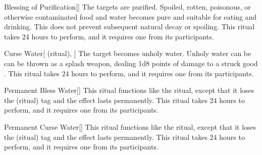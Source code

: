 \lowercase{\hypertarget{spell:Blessing of Purification}{}}\label{spell:Blessing of Purification}
\begin{freeability}[Rank 1]{\hypertarget{spell:Blessing of Purification}{Blessing of Purification}}[]
The targets are purified.
Spoiled, rotten, poisonous, or otherwise contaminated food and water becomes pure and suitable for eating and drinking.
This does not prevent subsequent natural decay or spoiling.
This ritual takes 24 hours to perform, and it requires one  from its participants.
\end{freeability}
\vspace{0.25em}



\lowercase{\hypertarget{spell:Curse Water}{}}\label{spell:Curse Water}
\begin{attuneability}[Rank 1]{\hypertarget{spell:Curse Water}{Curse Water}}[ (ritual), ]
The target becomes unholy water.
Unholy water can be can be thrown as a splash weapon, dealing 1d8 points of damage to a struck good .
This ritual takes 24 hours to perform, and it requires one  from its participants.
\end{attuneability}
\vspace{0.25em}



\lowercase{\hypertarget{spell:Permanent Bless Water}{}}\label{spell:Permanent Bless Water}
\begin{freeability}[Rank 3]{\hypertarget{spell:Permanent Bless Water}{Permanent Bless Water}}[]
This ritual functions like the  ritual, except that it loses the  (ritual) tag and the effect lasts permanently.
This ritual takes 24 hours to perform, and it requires one  from its participants.
\end{freeability}
\vspace{0.25em}



\lowercase{\hypertarget{spell:Permanent Curse Water}{}}\label{spell:Permanent Curse Water}
\begin{freeability}[Rank 3]{\hypertarget{spell:Permanent Curse Water}{Permanent Curse Water}}[]
This ritual functions like the  ritual, except that it loses the  (ritual) tag and the effect lasts permanently.
This ritual takes 24 hours to perform, and it requires one  from its participants.
\end{freeability}
\vspace{0.25em}



